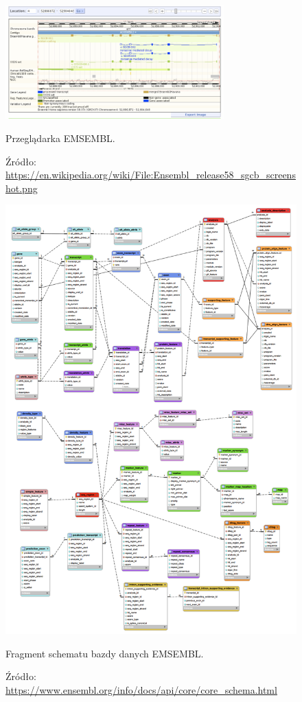 \begin{itemize}
	\begin{figure}[h]
		\centering
		\includegraphics[width=0.75\textwidth]{img/browser-ensembl.png}
		\caption{Przeglądarka EMSEMBL.}
		\vspace{-0.5cm}
		\caption*{\scriptsize Źródło: \url{https://en.wikipedia.org/wiki/File:Ensembl\_release58\_sgcb\_screenshot.png}}
		\label{img:przegladarka-ensembl}
	\end{figure}
	\begin{figure}[h]
		\centering
		\includegraphics[width=1\textwidth]{img/db-ensembl.png}
		\caption{Fragment schematu bazdy danych EMSEMBL.}
		\vspace{-0.5cm}
		\caption*{\scriptsize Źródło: \url{https://www.ensembl.org/info/docs/api/core/core\_schema.html}}
		\label{img:db-ensebl}
	\end{figure}
		

\end{itemize}

